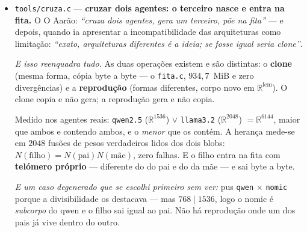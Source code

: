 \documentclass[11pt]{article}
\newcommand{\code}[1]{\texttt{\small #1}}
\newcommand{\R}{\mathbb R}
\theoremstyle{plain}
\theoremstyle{remark}
\begin{document}
\begin{itemize}
\emph{E a separação que o recado pedia:} \textbf{voar} e \textbf{conservar} são perguntas distintas.
O viveiro respondeu à primeira ($\gcd=1$); a segunda responde-se aqui, e a resposta é \emph{sempre}
--- a norma é multiplicativa \textbf{mesmo quando o produto não é corpo}. É isso que faz de dois DNAs
um terceiro com herança medível, e não apenas com a dimensão certa.

\emph{E o que NÃO vale, dito:} $S(A\otimes B) \neq S(A)\,S(B)$ --- a parte simétrica não é
multiplicativa. Quem é multiplicativa é a norma, que \emph{combina} as duas metades. A dobra
antissimétrica mistura; não separa.

\emph{E um erro de sinal anterior, que vale registar porque é o que se costumo saltar:} escrevi a norma
como $x^2 - mxy - y^2$ quando ela sai do conjugado, $N = x^2 + xy(\sigma+\sigma') + y^2\sigma\sigma'$
com $\sigma+\sigma'=m$ e $\sigma\sigma'=-1$, logo $x^2 + mxy - y^2$. Com o sinal trocado falhavam
$4632$ de $7203$ fusões --- e a culpa não era da fusão. É o item~2 da ordem de diagnóstico (as
convenções antes da lógica), e fui direito à lógica outra vez.

\item \code{tools/cruza.c} --- \textbf{cruzar dois agentes: o terceiro nasce e entra na fita.} O
O Aarão: \emph{``cruza dois agentes, gera um terceiro, põe na fita''} --- e depois, quando ia
apresentar a incompatibilidade das arquiteturas como limitação: \emph{``exato, arquiteturas
diferentes é a ideia; se fosse igual seria clone''}.

\emph{E isso reenquadra tudo.} As duas operações existem e são distintas: o \textbf{clone} (mesma
forma, cópia byte a byte --- o \code{fita.c}, $934{,}7$~MiB e zero divergências) e a
\textbf{reprodução} (formas diferentes, corpo novo em $\R^{\mathrm{lcm}}$). O clone copia e não
gera; a reprodução gera e não copia.

Medido nos agentes reais: \code{qwen2.5} ($\R^{1536}$) $\vee$ \code{llama3.2} ($\R^{2048}$) $=
\R^{6144}$, maior que ambos e contendo ambos, e o \emph{menor} que os contém. A herança mede-se em
$2048$ fusões de pesos verdadeiros lidos dos dois blobs: $N(\text{filho}) = N(\text{pai})N(\text{mãe})$,
zero falhas. E o filho entra na fita com \textbf{telómero próprio} --- diferente do do pai e do da
mãe --- e sai byte a byte.

\emph{E um caso degenerado que se escolhi primeiro sem ver:} pus \code{qwen} $\times$ \code{nomic}
porque a divisibilidade os destacava --- mas $768 \mid 1536$, logo o nomic é \emph{subcorpo} do qwen
e o filho sai igual ao pai. Não há reprodução onde um dos pais já vive dentro do outro.


\end{itemize}
\end{document}
